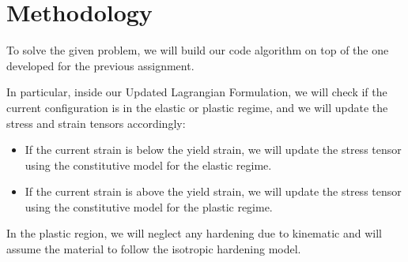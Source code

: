 \section{Methodology}
\label{sec:methodology}

To solve the given problem, we will build our code algorithm on top of the one developed for the previous assignment.

In particular, inside our Updated Lagrangian Formulation, we will check if the current configuration is in the elastic or plastic regime, and we will update the stress and strain tensors accordingly:

\begin{itemize}
    \item If the current strain is below the yield strain, we will update the stress tensor using the constitutive model for the elastic regime.
    \item If the current strain is above the yield strain, we will update the stress tensor using the constitutive model for the plastic regime.
\end{itemize}

In the plastic region, we will neglect any hardening due to kinematic and will assume the material to follow the isotropic hardening model.